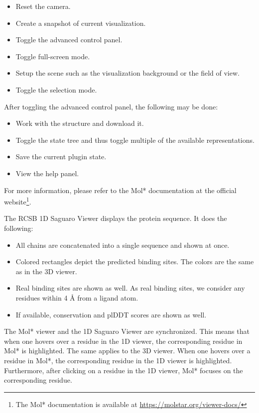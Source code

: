 \begin{itemize}
    \item Reset the camera.
    \item Create a snapshot of current visualization.
    \item Toggle the advanced control panel.
    \item Toggle full-screen mode.
    \item Setup the scene such as the visualization background or the field of view.
    \item Toggle the selection mode.
\end{itemize}

After toggling the advanced control panel, the following may be done:

\begin{itemize}
    \item Work with the structure and download it.
    \item Toggle the state tree and thus toggle multiple of the available representations.
    \item Save the current plugin state.
    \item View the help panel.
\end{itemize}

For more information, please refer to the Mol* documentation at the official website\footnote{The Mol* documentation is available at \url{https://molstar.org/viewer-docs/}}.

The RCSB 1D Saguaro Viewer displays the protein sequence. It does the following:

\begin{itemize}
    \item All chains are concatenated into a single sequence and shown at once.
    \item Colored rectangles depict the predicted binding sites. The colors are the same as in the 3D viewer.
    \item Real binding sites are shown as well. As real binding sites, we consider any residues within 4 \AA{} from a ligand atom.
    \item If available, conservation and plDDT scores are shown as well.
\end{itemize}

The Mol* viewer and the 1D Saguaro Viewer are synchronized. This means that when one hovers over a residue in the 1D viewer, the corresponding residue in Mol* is highlighted. The same applies to the 3D viewer. When one hovers over a residue in Mol*, the corresponding residue in the 1D viewer is highlighted. Furthermore, after clicking on a residue in the 1D viewer, Mol* focuses on the corresponding residue.

